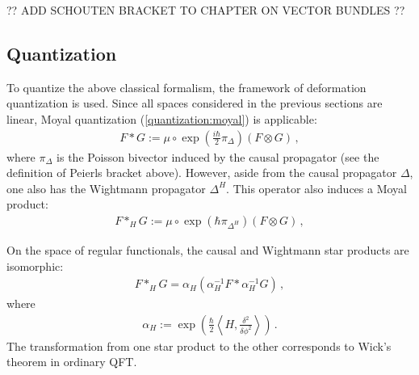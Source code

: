     ?? ADD SCHOUTEN BRACKET TO CHAPTER ON VECTOR BUNDLES ??

\subsection{Quantization}

    To quantize the above classical formalism, the framework of deformation quantization is used. Since all spaces considered in the previous sections are linear, Moyal quantization (\cref{quantization:moyal}) is applicable:
    \begin{gather}
        F\ast G := \mu\circ\exp(\tfrac{i\hbar}{2}\pi_\Delta)(F\otimes G)\,,
    \end{gather}
    where $\pi_\Delta$ is the Poisson bivector induced by the causal propagator (see the definition of Peierls bracket above). However, aside from the causal propagator $\Delta$, one also has the Wightmann propagator $\Delta^H$. This operator also induces a Moyal product:
    \begin{gather}
        \label{aqft:moyal_product}
        F\ast_HG := \mu\circ\exp(\hbar\pi_{\Delta^H})(F\otimes G)\,,
    \end{gather}

    \begin{property}
        On the space of regular functionals, the causal and Wightmann star products are isomorphic:
        \begin{gather}
            F\ast_HG = \alpha_H(\alpha_H^{-1}F\ast\alpha_H^{-1}G)\,,
        \end{gather}
        where
        \begin{gather}
            \alpha_H := \exp\left(\frac{\hbar}{2}\left\langle H,\frac{\delta^2}{\delta\phi^2}\right\rangle\right)\,.
        \end{gather}
        The transformation from one star product to the other corresponds to Wick's theorem in ordinary QFT.
    \end{property}

